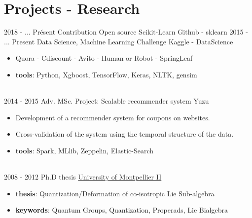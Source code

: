 \documentclass[letterpaper]{twentysecondcv} %
\begin{document}
\section{Projects - Research}{\faClipboard}
\begin{twenty}
	\twentyitem
			{2018 - ...}
			{Pr\'esent}
			{Contribution Open source Scikit-Learn}
			{Github - sklearn}
			{}
			{}
	\twentyitem
			{2015 - ...}
			{Present}
			{Data Science, Machine Learning Challenge}
			{Kaggle - DataScience}
			{}
			{\vspace{-2mm}\begin{itemize}[topsep=0pt,partopsep=0pt]
			 \item Quora - Cdiscount - Avito - Human or Robot - SpringLeaf
			 \item \textbf{tools}: Python, Xgboost, TensorFlow, Keras, NLTK, gensim
			\end{itemize}} \\
			
	\twentyitem
    	{2014 - 2015}
		{}
        {Adv. MSc. Project: Scalable recommender system}
        {Yuzu}
        {}
        {\vspace{-2mm}\begin{itemize}[topsep=0pt,partopsep=0pt]
        \item Development of a recommender system for coupons on websites.
				\item Cross-validation of the system using the temporal structure of the data.
        \item \textbf{tools}: Spark, MLlib, Zeppelin, Elastic-Search
		\end{itemize}} \\
		
	\twentyitem
			{2008 - 2012}
			{}
			{Ph.D thesis}
			{\href{http://www.umontpellier.fr/}{University of Montpellier II}}
			{}
			{\vspace{-2mm}\begin{itemize}[topsep=0pt,partopsep=0pt]
			\item \textbf{thesis}: Quantization/Deformation of co-isotropic Lie Sub-algebra
			\item \textbf{keywords}: Quantum Groups, Quantization, Properads, Lie Bialgebra
			\end{itemize}}
\end{twenty}
\end{document}
